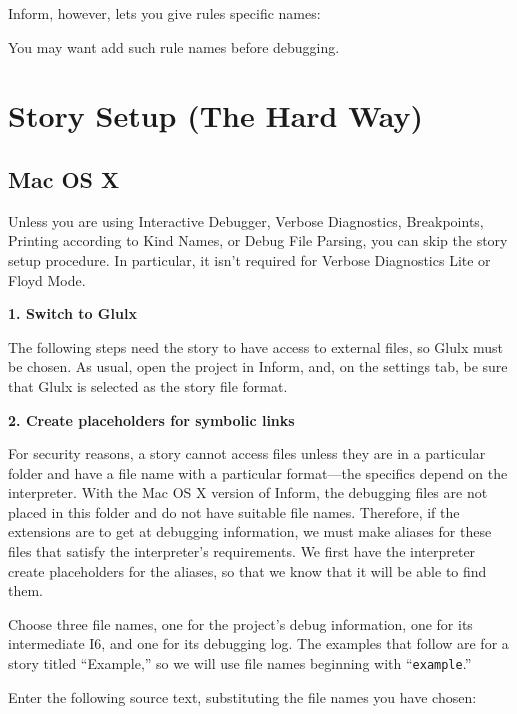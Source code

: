 \documentclass{book}
\newcommand{\lastpagebreak}{\vfill\pagebreak}
\begin{document}
Inform, however, lets you give rules specific names:

\begin{quote}
  
\end{quote}

You may want add such rule names before debugging.

\lastpagebreak

\section{Story Setup (The Hard Way)}
\label{including-hard}

\subsection{Mac OS X}

Unless you are using Interactive Debugger, Verbose Diagnostics, Breakpoints,
Printing according to Kind Names, or Debug File Parsing, you can skip the story
setup procedure.  In particular, it isn't required for Verbose Diagnostics Lite
or Floyd Mode.

\textbf{1. Switch to Glulx}

The following steps need the story to have access to external files, so Glulx
must be chosen.  As usual, open the project in Inform, and, on the settings tab,
be sure that Glulx is selected as the story file format.

\textbf{2. Create placeholders for symbolic links}

For security reasons, a story cannot access files unless they are in a
particular folder and have a file name with a particular format---the specifics
depend on the interpreter.  With the Mac OS X version of Inform, the debugging
files are not placed in this folder and do not have suitable file names.
Therefore, if the extensions are to get at debugging information, we must make
aliases for these files that satisfy the interpreter's requirements.  We first
have the interpreter create placeholders for the aliases, so that we know that
it will be able to find them.

Choose three file names, one for the project's debug information, one for its
intermediate I6, and one for its debugging log.  The examples that follow are
for a story titled ``Example,'' so we will use file names beginning with
``\texttt{example}.''

Enter the following source text, substituting the file names you have chosen:
\end{document}

